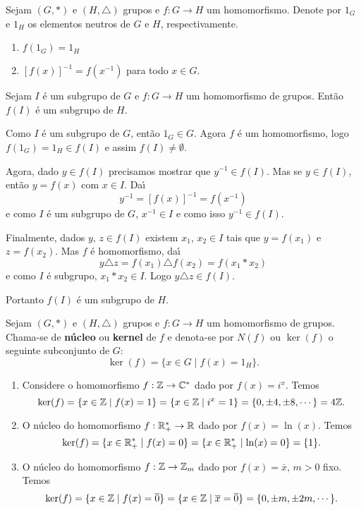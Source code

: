 \begin{proposicao}
	Sejam $(G, *)$ e $(H, \triangle)$ grupos e $f : G \to H$ um homomorfismo. Denote por $1_G$ e $1_H$ os elementos neutros de $G$ e $H$, respectivamente.
	\begin{enumerate}[label={\roman*})]
		\item $f(1_G) = 1_H$
		\item $[f(x)]^{-1} = f(x^{-1})$ para todo $x \in G$.
	\end{enumerate}
\end{proposicao}

\begin{proposicao}
	Sejam $I$ \'e um subgrupo de $G$ e $f : G \to H$ um homomorfismo de grupos. Ent\~ao $f(I)$ \'e um subgrupo de $H$.
\end{proposicao}
\begin{prova}
	Como $I$ \'e um subgrupo de $G$, ent\~ao $1_G \in G$. Agora $f$ \'e um homomorfismo, logo $f(1_G) = 1_H \in f(I)$ e assim $f(I) \ne \emptyset$.

	Agora, dado $y \in f(I)$ precisamos mostrar que $y^{-1} \in f(I)$. Mas se $y \in f(I)$, ent\~ao $y = f(x)$ com $x \in I$. Da{\'\i}
	\[
		y^{-1} = [f(x)]^{-1} = f(x^{-1})
	\]
	e como $I$ \'e um subgrupo de $G$, $x^{-1} \in I$ e como isso $y^{-1} \in f(I)$.

	Finalmente, dados $y$, $z \in f(I)$ existem $x_1$, $x_2 \in I$ tais que $y = f(x_1)$ e $z = f(x_2)$. Mas $f$ \'e homomorfismo, da{\'\i}
	\[
		y\triangle z = f(x_1)\triangle f(x_2) = f(x_1*x_2)
	\]
	e como $I$ \'e subgrupo, $x_1*x_2 \in I$. Logo $y\triangle z \in f(I)$.

	Portanto $f(I)$ \'e um subgrupo de $H$.
\end{prova}

\begin{definicao}
	Sejam $(G, *)$ e $(H, \triangle)$ grupos e $f : G \to H$ um homomorfismo de grupos. Chama-se de \textbf{n\'ucleo} ou \textbf{kernel} de $f$ e denota-se por $N(f)$ ou $\ker(f)$ o seguinte subconjunto de $G$:
	\[
		\ker(f) = \{x \in G \mid f(x) = 1_H\}.
	\]
\end{definicao}

\begin{exemplos}
	\begin{enumerate}[label={\roman*})]
		\item Considere o homomorfismo $f : \mathbb{Z} \to \mathbb{C}^*$ dado por $f(x) = i^x$. Temos
		\[
			\ker(f) = \{x \in \mathbb{Z} \mid f(x) = 1\} = \{x \in \mathbb{Z} \mid i^x = 1\} = \{0, \pm 4, \pm 8, \cdots\} = 4\mathbb{Z}.
		\]

		\item O n\'ucleo do homomorfismo $f : \mathbb{R}^*_+ \to \mathbb{R}$ dado por $f(x) = \ln(x)$. Temos
		\[
			\ker(f) = \{x \in \mathbb{R}^*_+ \mid f(x) = 0\} = \{x \in \mathbb{R}^*_+ \mid \ln(x) = 0\} = \{1\}.
		\]

		\item O n\'ucleo do homomorfismo $f : \mathbb{Z} \to \mathbb{Z}_m$ dado por $f(x) = \overline{x}$, $m > 0$ fixo. Temos
		\[
			\ker(f) = \{x \in \mathbb{Z} \mid f(x) = \overline{0}\} = \{x \in \mathbb{Z} \mid \overline{x} = \overline{0}\} = \{0, \pm m, \pm 2m, \cdots\}.
		\]
	\end{enumerate}
\end{exemplos}

